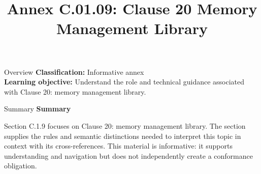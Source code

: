\documentclass[10pt,letterpaper]{article}
\title{Annex C.01.09: Clause 20 Memory Management Library}
\author{}
\date{}
\begin{document}
\maketitle
\begin{CornellOverviewBox}{Overview}
\textbf{Classification:} Informative annex\\[2pt]
\textbf{Learning objective:} Understand the role and technical guidance associated with Clause 20: memory management library.
\end{CornellOverviewBox}\begin{CornellSummaryBox}{Summary}
{\sffamily\bfseries\color{Accent} Summary}\par\vspace{3pt}Section C.1.9 focuses on Clause 20: memory management library. The section supplies the rules and semantic distinctions needed to interpret this topic in context with its cross-references. This material is informative: it supports understanding and navigation but does not independently create a conformance obligation.
\end{CornellSummaryBox}
\end{document}

